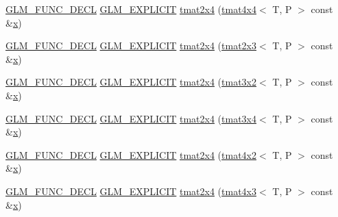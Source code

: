\begin{DoxyCompactItemize}
\item 
\mbox{\hyperlink{setup_8hpp_ab2d052de21a70539923e9bcbf6e83a51}{G\+L\+M\+\_\+\+F\+U\+N\+C\+\_\+\+D\+E\+CL}} \mbox{\hyperlink{setup_8hpp_a6c74f5a5e7b134ab69023ff9a30d4d5d}{G\+L\+M\+\_\+\+E\+X\+P\+L\+I\+C\+IT}} \mbox{\hyperlink{structglm_1_1tmat2x4_ada474dee56734cd6ad136b0845e1f71e}{tmat2x4}} (\mbox{\hyperlink{structglm_1_1tmat4x4}{tmat4x4}}$<$ T, P $>$ const \&\mbox{\hyperlink{glad_8h_a92d0386e5c19fb81ea88c9f99644ab1d}{x}})
\item 
\mbox{\hyperlink{setup_8hpp_ab2d052de21a70539923e9bcbf6e83a51}{G\+L\+M\+\_\+\+F\+U\+N\+C\+\_\+\+D\+E\+CL}} \mbox{\hyperlink{setup_8hpp_a6c74f5a5e7b134ab69023ff9a30d4d5d}{G\+L\+M\+\_\+\+E\+X\+P\+L\+I\+C\+IT}} \mbox{\hyperlink{structglm_1_1tmat2x4_ad992a0195fb70e4ec2345b8ce248a9a6}{tmat2x4}} (\mbox{\hyperlink{structglm_1_1tmat2x3}{tmat2x3}}$<$ T, P $>$ const \&\mbox{\hyperlink{glad_8h_a92d0386e5c19fb81ea88c9f99644ab1d}{x}})
\item 
\mbox{\hyperlink{setup_8hpp_ab2d052de21a70539923e9bcbf6e83a51}{G\+L\+M\+\_\+\+F\+U\+N\+C\+\_\+\+D\+E\+CL}} \mbox{\hyperlink{setup_8hpp_a6c74f5a5e7b134ab69023ff9a30d4d5d}{G\+L\+M\+\_\+\+E\+X\+P\+L\+I\+C\+IT}} \mbox{\hyperlink{structglm_1_1tmat2x4_a52740ff1048b8283e22c07c743aaf8f9}{tmat2x4}} (\mbox{\hyperlink{structglm_1_1tmat3x2}{tmat3x2}}$<$ T, P $>$ const \&\mbox{\hyperlink{glad_8h_a92d0386e5c19fb81ea88c9f99644ab1d}{x}})
\item 
\mbox{\hyperlink{setup_8hpp_ab2d052de21a70539923e9bcbf6e83a51}{G\+L\+M\+\_\+\+F\+U\+N\+C\+\_\+\+D\+E\+CL}} \mbox{\hyperlink{setup_8hpp_a6c74f5a5e7b134ab69023ff9a30d4d5d}{G\+L\+M\+\_\+\+E\+X\+P\+L\+I\+C\+IT}} \mbox{\hyperlink{structglm_1_1tmat2x4_aff5a2bf784029b260a810cf84ff5f228}{tmat2x4}} (\mbox{\hyperlink{structglm_1_1tmat3x4}{tmat3x4}}$<$ T, P $>$ const \&\mbox{\hyperlink{glad_8h_a92d0386e5c19fb81ea88c9f99644ab1d}{x}})
\item 
\mbox{\hyperlink{setup_8hpp_ab2d052de21a70539923e9bcbf6e83a51}{G\+L\+M\+\_\+\+F\+U\+N\+C\+\_\+\+D\+E\+CL}} \mbox{\hyperlink{setup_8hpp_a6c74f5a5e7b134ab69023ff9a30d4d5d}{G\+L\+M\+\_\+\+E\+X\+P\+L\+I\+C\+IT}} \mbox{\hyperlink{structglm_1_1tmat2x4_a871b56fba1a79bfe5b48920c388ef607}{tmat2x4}} (\mbox{\hyperlink{structglm_1_1tmat4x2}{tmat4x2}}$<$ T, P $>$ const \&\mbox{\hyperlink{glad_8h_a92d0386e5c19fb81ea88c9f99644ab1d}{x}})
\item 
\mbox{\hyperlink{setup_8hpp_ab2d052de21a70539923e9bcbf6e83a51}{G\+L\+M\+\_\+\+F\+U\+N\+C\+\_\+\+D\+E\+CL}} \mbox{\hyperlink{setup_8hpp_a6c74f5a5e7b134ab69023ff9a30d4d5d}{G\+L\+M\+\_\+\+E\+X\+P\+L\+I\+C\+IT}} \mbox{\hyperlink{structglm_1_1tmat2x4_ae3ecb4edcc52b02b181e07a44d0511c8}{tmat2x4}} (\mbox{\hyperlink{structglm_1_1tmat4x3}{tmat4x3}}$<$ T, P $>$ const \&\mbox{\hyperlink{glad_8h_a92d0386e5c19fb81ea88c9f99644ab1d}{x}})

\end{DoxyCompactItemize}
